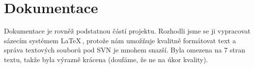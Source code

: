 \section{Dokumentace}

Dokumentace je rovněž podstatnou částí projektu. Rozhodli jsme se ji vypracovat sázecím systémem \LaTeX\,, protože nám umožňuje kvalitně formátovat text a správa textových souborů pod SVN je mnohem snazší. Byla omezena na 7 stran textu, takže byla výrazně krácena (doufáme, že ne na úkor kvality).
